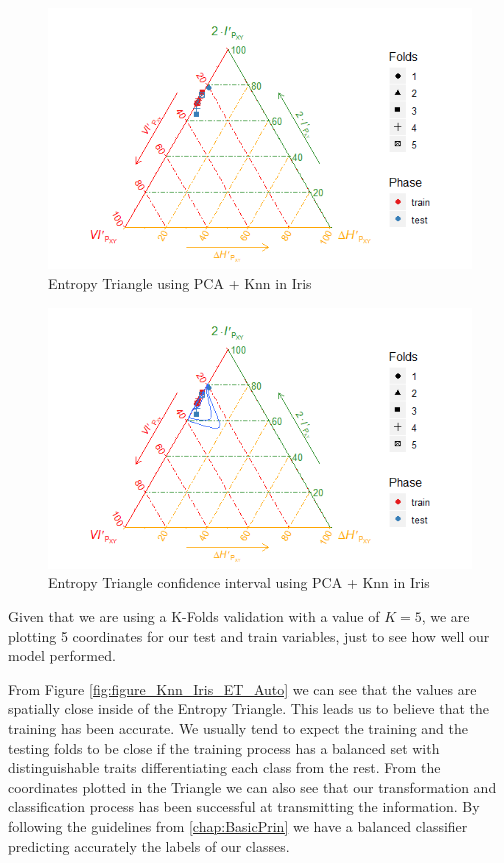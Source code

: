 \begin{figure}[H]
	\centering
	\includegraphics[width=\linewidth]{Figuras_tfg/ET_knn_iris_pca}
	\caption{Entropy Triangle using PCA + Knn in Iris}
	\label{fig:figure_Knn_Iris_ET_PCA}
\end{figure}

\begin{figure}[H]
	\centering
	\includegraphics[width=\linewidth]{Figuras_tfg/ET_knn_iris_pca_confidence}
	\caption{Entropy Triangle confidence interval using PCA + Knn in Iris}
	\label{fig:figure_Knn_Iris_ET_PCA_Confidence}
\end{figure}

 Given that we are using a K-Folds validation with a value of $K = 5$, we are plotting 5 coordinates for our test and train variables, just to see how well our model performed.\newline

From Figure \ref{fig:figure_Knn_Iris_ET_Auto} we can see that the values are spatially close inside of the Entropy Triangle. This leads us to believe that the training has been accurate. We usually tend to expect the training and the testing folds to be close if the training process has a balanced set with distinguishable traits differentiating each class from the rest. From the coordinates plotted in the Triangle we can also see that our transformation and classification process has been successful at transmitting the information. By following the guidelines from \ref{chap:BasicPrin} we have a balanced classifier predicting accurately the labels of our classes.  \par

